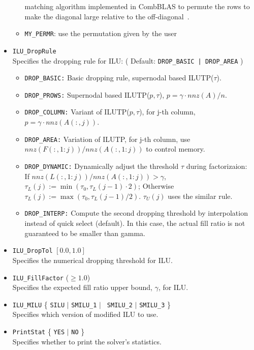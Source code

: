 \begin{itemize}
\begin{itemize}
      matching algorithm implemented in CombBLAS to permute the rows to
      make the diagonal large relative to the off-diagonal~\cite{awpm}.
    \item {\tt MY\_PERMR}: use the permutation given by the user
    \end{itemize}
\item {\tt ILU\_DropRule} \\
    Specifies the dropping rule for ILU: ( Default: {\tt DROP\_BASIC | DROP\_AREA} )
  \begin{itemize}
  \item {\tt DROP\_BASIC:} Basic dropping rule, supernodal based ILUTP($\tau$).
  \item {\tt DROP\_PROWS:} Supernodal based ILUTP($p,\tau$), 
                   $p = \gamma\cdot nnz(A)/n$.
  \item {\tt DROP\_COLUMN:} Variant of ILUTP($p,\tau$), for j-th column,
			      $p = \gamma \cdot nnz(A(:,j))$.
  \item {\tt DROP\_AREA:}    Variation of ILUTP, for j-th column, use
		      $nnz(F(:,1:j)) / nnz(A(:,1:j))$ to control memory.
  \item {\tt DROP\_DYNAMIC:} Dynamically adjust the threshold $\tau$ during factorizaion:\\
			  If $nnz(L(:,1:j)) / nnz(A(:,1:j)) > \gamma$,
 			     $\tau_L(j) := \min(\tau_0, \tau_L(j-1)\cdot 2)$;
 			  Otherwise
			    $\tau_L(j) := \max(\tau_0, \tau_L(j-1) / 2)$. 
 			  $\tau_U(j)$ uses the similar rule.
  \item {\tt DROP\_INTERP:}  Compute the second dropping threshold by
 	                  interpolation instead of quick select (default).
   		          In this case, the actual fill ratio is not
 			  guaranteed to be smaller than gamma.
  \end{itemize}
\item {\tt ILU\_DropTol}  $[0.0, 1.0]$ \\
    Specifies the numerical dropping threshold for ILU.
\item {\tt ILU\_FillFactor} ($ \ge 1.0 $)\\
    Specifies the expected fill ratio upper bound, $\gamma$, for ILU.
\item {\tt ILU\_MILU} \{ {\tt SILU} $|$ {\tt SMILU\_1} $|$ {\tt
  SMILU\_2} $|$ {\tt SMILU\_3} \} \\
    Specifies which version of modified ILU to use.
\item {\tt PrintStat}  \{ {\tt YES} $|$ {\tt NO} \} \\
    Specifies whether to print the solver's statistics.
\end{itemize}

